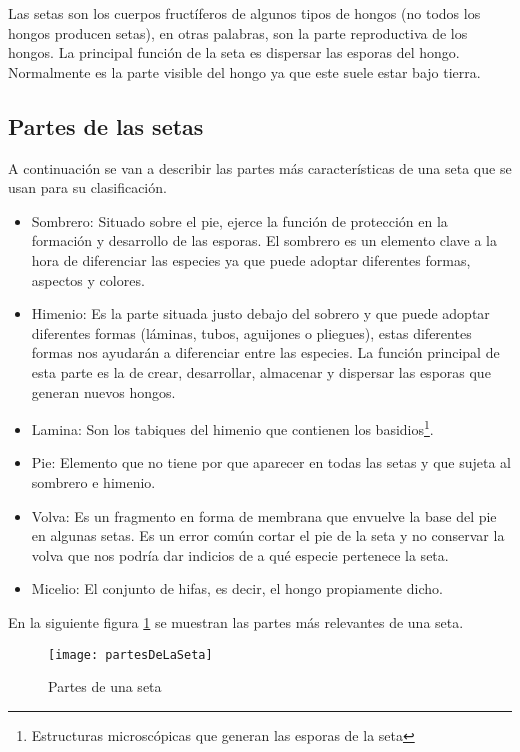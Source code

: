 Las setas son los cuerpos fructíferos de algunos tipos de hongos (no todos los hongos producen setas), en otras palabras, son la parte reproductiva de los hongos. La principal función de la seta es dispersar las esporas del hongo. Normalmente es la parte visible del hongo ya que este suele estar bajo tierra.

\subsection{Partes de las setas}

A continuación se van a describir las partes más características de una seta que se usan para su clasificación.

\begin{itemize}
	\item{Sombrero}: Situado sobre el pie, ejerce la función de protección en la formación y desarrollo de las esporas. El sombrero es un elemento clave a la hora de diferenciar las especies ya que puede adoptar diferentes formas, aspectos y colores.
	\item{Himenio}: Es la parte situada justo debajo del sobrero y que puede adoptar diferentes formas (láminas, tubos, aguijones o pliegues), estas diferentes formas nos ayudarán a diferenciar entre las especies. La función principal de esta parte es la de crear, desarrollar, almacenar y dispersar las esporas que generan nuevos hongos.
	\item{Lamina}: Son los tabiques del himenio que contienen los basidios\footnote{Estructuras microscópicas que generan las esporas de la seta}.
	\item{Pie}: Elemento que no tiene por que aparecer en todas las setas y que sujeta al sombrero e himenio.
	\item{Volva}: Es un fragmento en forma de membrana que envuelve la base del pie en algunas setas. Es un error común cortar el pie de la seta y no conservar la volva que nos podría dar indicios de a qué especie pertenece la seta.
	\item{Micelio}: El conjunto de hifas, es decir, el hongo propiamente dicho.~\cite{partesSeta}
\end{itemize}


En la siguiente figura \ref{figpartesDeLaSeta} se muestran las partes más relevantes de una seta.

\begin{figure}[h]
    \begin{center}%
        \begin{center}%
          \texttt{[image: partesDeLaSeta]}%
          \caption{Partes de una seta \cite{imagenPartesSeta}}%
          \label{figpartesDeLaSeta}%
        \end{center}%
  	\end{center}%
\end{figure}%

